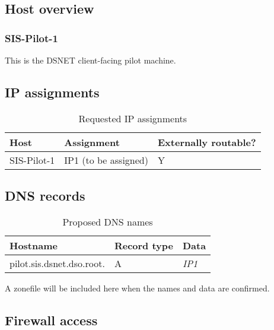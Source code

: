\documentclass[10pt,a4paper]{article}
\begin{document}
\subsection{Host overview}

\subsubsection{SIS-Pilot-1}

This is the DSNET client-facing pilot machine.

\subsection{IP assignments}

\begin{table}[h!]
    \caption{Requested IP assignments}
    \begin{tabular}{l l l}
        Host & Assignment & Externally routable? \\
        \hline
        SIS-Pilot-1 & IP1 (to be assigned) & Y \\
    \end{tabular}
\end{table}


\subsection{DNS records}

\begin{table}[h!]
    \caption{Proposed DNS names}
    \begin{tabular}{l l l}
        Hostname & Record type & Data \\
        \hline
        pilot.sis.dsnet.dso.root. & A & \emph{IP1} \\
    \end{tabular}
\end{table}

A zonefile will be included here when the names and data are confirmed.

\subsection{Firewall access}
\end{document}
